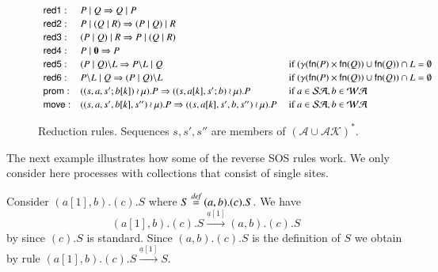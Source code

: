 {\begin{figure}[t] 
\[
\begin{array}{lll}
\textsf{red1}: & P\mid Q \Rightarrow Q\mid P& 
\\[2pt]
\textsf{red2}: & P\mid (Q\mid R) \Rightarrow (P\mid Q)\mid R &
\\[2pt]
\textsf{red3}: & (P\mid Q)\mid R \Rightarrow P\mid (Q\mid R) & 
\\[2pt]
\textsf{red4}: & P\mid \mathbf{0} \Rightarrow P & 
\\[2pt]
\textsf{red5}: & (P\; \vert \; Q)\backslash L \Rightarrow P\backslash L \; \vert \; Q &
   \mbox{ if } (\gamma(\mathsf{fn}(P) \times \mathsf{fn}(Q)) \cup  \mathsf{fn}(Q)) \cap L = \emptyset
\\[2pt]
\textsf{red6}: & P\backslash L \; \vert \; Q \Rightarrow (P\; \vert \; Q)\backslash L & 
   \mbox{ if } (\gamma(\mathsf{fn}(P) \times \mathsf{fn}(Q)) \cup  \mathsf{fn}(Q)) \cap L = \emptyset
\\[2pt]
\textsf{prom}: & ( (s,a,s';b[k])\wr \mu).P \Rightarrow ((s,a[k],s';b)\wr \mu).P & \mbox{ if } a \in \mathcal{SA}, b \in \mathcal{WA} 
\\[2pt]
\textsf{move}: & ((s,a,s',b[k],s'')\wr \mu).P \Rightarrow ((s,a[k],s',b,s'')\wr \mu).P & \mbox{ if } a \in \mathcal{SA}, b \in \mathcal{WA}
\end{array}
\] 
\caption{Reduction rules. Sequences $s, s', s''$ are members of $(\mathcal{A} \cup \mathcal{AK})^{*}$.} 
\label{fig:reduction}
\end{figure}

The next example illustrates how some of the reverse SOS rules work. We only consider here processes with collections that consist of single sites. 
\begin{example}
{\rm 
Consider $(a[1],b).(c).S$ where $S\stackrel{\emph{def}}{=} (a,b).(c).S$. We have 
$$(a[1],b).(c).S \xrightarrow{\underline{a}[1]} (a,b).(c).S$$ by  since $(c).S$ is standard.
Since $(a,b).(c).S$ is the definition of $S$ we obtain by rule  $(a[1],b).(c).S \xrightarrow{\underline{a}[1]} S$.
}
\end{example}

}
